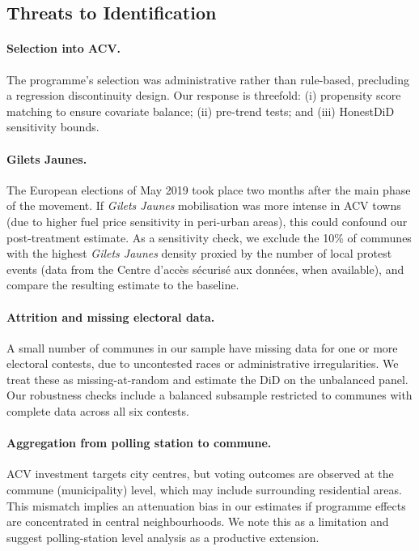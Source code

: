 \subsection{Threats to Identification}

\paragraph{Selection into ACV.} The programme's selection was administrative rather than rule-based, precluding a regression discontinuity design. Our response is threefold: (i) propensity score matching to ensure covariate balance; (ii) pre-trend tests; and (iii) HonestDiD sensitivity bounds.

\paragraph{Gilets Jaunes.} The European elections of May 2019 took place two months after the main phase of the movement. If \textit{Gilets Jaunes} mobilisation was more intense in ACV towns (due to higher fuel price sensitivity in peri-urban areas), this could confound our post-treatment estimate. As a sensitivity check, we exclude the 10\% of communes with the highest \textit{Gilets Jaunes} density proxied by the number of local protest events (data from the Centre d'accès sécurisé aux données, when available), and compare the resulting estimate to the baseline.

\paragraph{Attrition and missing electoral data.} A small number of communes in our sample have missing data for one or more electoral contests, due to uncontested races or administrative irregularities. We treat these as missing-at-random and estimate the DiD on the unbalanced panel. Our robustness checks include a balanced subsample restricted to communes with complete data across all six contests.

\paragraph{Aggregation from polling station to commune.} ACV investment targets city centres, but voting outcomes are observed at the commune (municipality) level, which may include surrounding residential areas. This mismatch implies an attenuation bias in our estimates if programme effects are concentrated in central neighbourhoods. We note this as a limitation and suggest polling-station level analysis as a productive extension.
